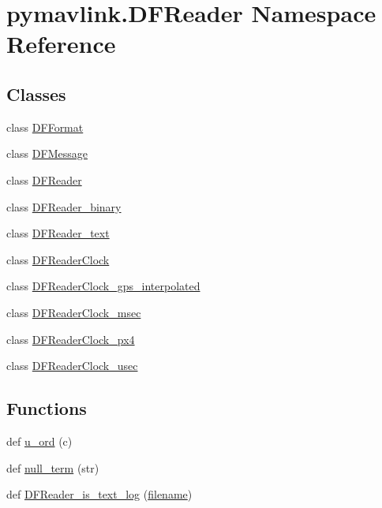 \hypertarget{namespacepymavlink_1_1DFReader}{}\section{pymavlink.\+D\+F\+Reader Namespace Reference}
\label{namespacepymavlink_1_1DFReader}
\subsection*{Classes}
\begin{DoxyCompactItemize}
\item 
class \mbox{\hyperlink{classpymavlink_1_1DFReader_1_1DFFormat}{D\+F\+Format}}
\item 
class \mbox{\hyperlink{classpymavlink_1_1DFReader_1_1DFMessage}{D\+F\+Message}}
\item 
class \mbox{\hyperlink{classpymavlink_1_1DFReader_1_1DFReader}{D\+F\+Reader}}
\item 
class \mbox{\hyperlink{classpymavlink_1_1DFReader_1_1DFReader__binary}{D\+F\+Reader\+\_\+binary}}
\item 
class \mbox{\hyperlink{classpymavlink_1_1DFReader_1_1DFReader__text}{D\+F\+Reader\+\_\+text}}
\item 
class \mbox{\hyperlink{classpymavlink_1_1DFReader_1_1DFReaderClock}{D\+F\+Reader\+Clock}}
\item 
class \mbox{\hyperlink{classpymavlink_1_1DFReader_1_1DFReaderClock__gps__interpolated}{D\+F\+Reader\+Clock\+\_\+gps\+\_\+interpolated}}
\item 
class \mbox{\hyperlink{classpymavlink_1_1DFReader_1_1DFReaderClock__msec}{D\+F\+Reader\+Clock\+\_\+msec}}
\item 
class \mbox{\hyperlink{classpymavlink_1_1DFReader_1_1DFReaderClock__px4}{D\+F\+Reader\+Clock\+\_\+px4}}
\item 
class \mbox{\hyperlink{classpymavlink_1_1DFReader_1_1DFReaderClock__usec}{D\+F\+Reader\+Clock\+\_\+usec}}
\end{DoxyCompactItemize}
\subsection*{Functions}
\begin{DoxyCompactItemize}
\item 
def \mbox{\hyperlink{namespacepymavlink_1_1DFReader_ad202d6e037acb8dcf9af833b5f67edb6}{u\+\_\+ord}} (c)
\item 
def \mbox{\hyperlink{namespacepymavlink_1_1DFReader_a8115bbdbaaf67363fe3dadcc165a51db}{null\+\_\+term}} (str)
\item 
def \mbox{\hyperlink{namespacepymavlink_1_1DFReader_ae34df4fd2613fd70e018a0d4f460e082}{D\+F\+Reader\+\_\+is\+\_\+text\+\_\+log}} (\mbox{\hyperlink{namespacepymavlink_1_1DFReader_a9653e10b2651c68cf8b171d8dd60f10c}{filename}})
\end{DoxyCompactItemize}
